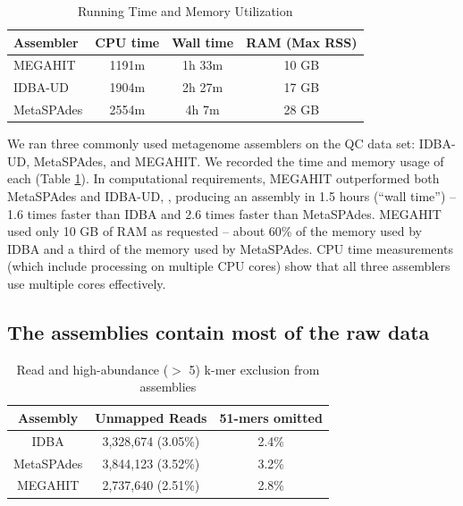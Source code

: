 \documentclass[11pt]{article}
\begin{document}
 \begin{table}[h]
\caption{Running Time and Memory Utilization}
\centering
\begin{tabular}{|l|c|c|c|}
\hline
\textbf{Assembler} & \textbf{CPU time} & \textbf{Wall time} & \textbf{RAM (Max RSS)} \\ [0.5ex]
\hline
MEGAHIT & 1191m & 1h 33m & 10 GB \\
\hline
IDBA-UD & 1904m & 2h 27m & 17 GB \\
\hline
MetaSPAdes & 2554m & 4h 7m & 28 GB \\
\hline

\end{tabular}
\label{table:time-memory}
\end{table}

We ran three commonly used metagenome assemblers on the QC data set:
IDBA-UD, MetaSPAdes, and MEGAHIT. We recorded the time and memory
usage of each (Table \ref{table:time-memory}).  In computational
requirements, MEGAHIT outperformed both MetaSPAdes and IDBA-UD, ,
producing an assembly in 1.5 hours (``wall time'') -- 1.6 times faster
than IDBA and 2.6 times faster than MetaSPAdes.  MEGAHIT used only 10
GB of RAM as requested -- about 60\% of the memory used by IDBA and a
third of the memory used by MetaSPAdes.  CPU
time measurements (which include processing on multiple CPU cores)
show that all three assemblers use multiple cores effectively.


\subsection*{The assemblies contain most of the raw data}






\begin{table}[!h]
\centering
\caption{Read and high-abundance ($>$ 5) k-mer exclusion from assemblies}
\begin{tabular}{|c|c|c|}\hline
  \textbf{Assembly} & \textbf{Unmapped Reads} & \textbf {51-mers omitted}
  \\ \hline
IDBA &3,328,674 (3.05\%)&  2.4\% \\ \hline
MetaSPAdes &3,844,123 (3.52\%) &  3.2\% \\ \hline
MEGAHIT &2,737,640 (2.51\%) &   2.8\% \\ \hline
\end{tabular}
\label{table:reads-kmers}
\end{table}
\end{document}
